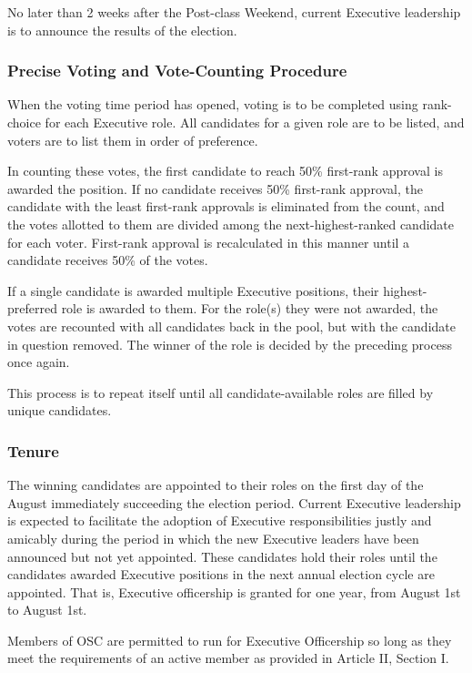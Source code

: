 \documentclass[12pt,letterpaper]{article}
\begin{document}
No later than 2 weeks after the Post-class Weekend, current Executive leadership is to
announce the results of the election.

\subsubsection{Precise Voting and Vote-Counting Procedure}

When the voting time period has opened, voting is to be completed using rank-choice for
each Executive role. All candidates for a given role are to be listed, and voters are to
list them in order of preference.

In counting these votes, the first candidate to reach 50\% first-rank approval is awarded
the position. If no candidate receives 50\% first-rank approval, the candidate with the
least first-rank approvals is eliminated from the count, and the votes allotted to them
are divided among the next-highest-ranked candidate for each voter. First-rank approval
is recalculated in this manner until a candidate receives 50\% of the votes.

If a single candidate is awarded multiple Executive positions, their highest-preferred role
is awarded to them. For the role(s) they were not awarded, the votes are recounted with
all candidates back in the pool, but with the candidate in question removed. The winner
of the role is decided by the preceding process once again.

This process is to repeat itself until all candidate-available roles are filled by unique
candidates.

\subsubsection{Tenure}

The winning candidates are appointed to their roles on the first day of the August
immediately succeeding the election period. Current Executive leadership is expected to
facilitate the adoption of Executive responsibilities justly and amicably during the
period in which the new Executive leaders have been announced but not yet appointed.
These candidates hold their roles until the candidates awarded Executive positions in the
next annual election cycle are appointed. That is, Executive officership is granted for
one year, from August 1st to August 1st.

Members of OSC are permitted to run for Executive Officership so long as they meet the
requirements of an active member as provided in Article II, Section I.
\end{document}
